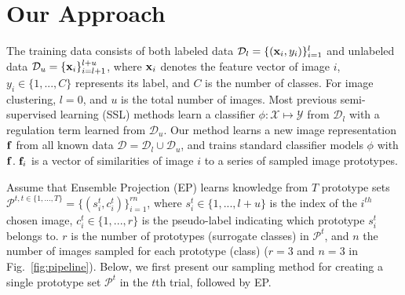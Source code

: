 

\section{Our Approach}
\label{sec:approach}


The training data consists of both labeled data $\mathcal{D}_l =
\{(\bold{x}_i, y_i)\}_{i=1}^{l}$ and unlabeled data $\mathcal{D}_u =
\{\bold{x}_i\}_{i=l+1}^{l+u}$, where $\bold{x}_i$ denotes the feature
vector of image $i$, $y_i \in\{1, ..., C\}$ represents its label, and
$C$ is the number of classes. For image clustering, $l=0$, and
$u$ is the total number of images.  Most previous semi-supervised
learning (SSL) methods learn a classifier $\phi: \mathcal{X} \mapsto
\mathcal{Y}$ from $\mathcal{D}_l$ with a regulation term learned from
$\mathcal{D}_u$. Our method learns a new image representation
$\bold{f}$ from all known data $\mathcal{D} = \mathcal{D}_l \cup
\mathcal{D}_u$, and trains standard classifier models $\phi$ with
$\bold{f}$.  $\bold{f}_i$ is a vector of similarities of image $i$ to
a series of sampled image prototypes.

Assume that Ensemble Projection (EP) learns knowledge from $T$
prototype sets $\mathcal{P}^{t, t\in \{1, ..., T \}}= \{(s_i^t,
c_i^t)\}_{i=1}^{rn}$, where $s_i^t \in \{1, ..., l+u \}$ is the index
of the $i^{th}$ chosen image, $c_i^t \in \{1, ..., r\}$ is the
pseudo-label indicating which prototype $s_i^t$ belongs to.  $r$ is the
number of prototypes (surrogate classes) in
$\mathcal{P}^t$, and $n$ the number of images sampled for each
prototype (class) (\eg $r=3$ and $n=3$ in Fig.~\ref{fig:pipeline}).
Below, we first present our sampling method for creating a single
prototype set $\mathcal{P}^t$ in the $t$th trial, followed by EP.


